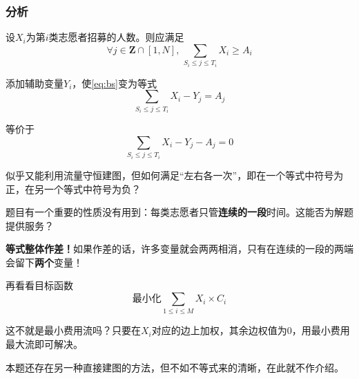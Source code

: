 \subsubsection{分析}
设$X_i$为第$i$类志愿者招募的人数。则应满足
\begin{equation} \label{eq:bs}
\forall j \in \mathbf{Z} \cap [1, N], \, \sum_{S_i \le j \le T_i}{X_i} \ge A_i
\end{equation}
\par 添加辅助变量$Y_i$，使\eqref{eq:bs}变为等式
\begin{displaymath}
\sum_{S_i \le j \le T_i}{X_i} - Y_j = A_j
\end{displaymath}
\par 等价于
\begin{displaymath} 
\sum_{S_i \le j \le T_i}{X_i} - Y_j - A_j = 0
\end{displaymath}
\par 似乎又能利用流量守恒建图，但如何满足“左右各一次”，即在一个等式中符号为正，在另一个等式中符号为负？
\par 题目有一个重要的性质没有用到：每类志愿者只管\textbf{连续的一段}时间。这能否为解题提供服务？
\par \textbf{等式整体作差！}如果作差的话，许多变量就会两两相消，只有在连续的一段的两端会留下\textbf{两个}变量！
\par 再看看目标函数
\begin{displaymath}
\text{最小化}\sum_{1 \le i \le M}{X_i \times C_i}
\end{displaymath}
\par 这不就是最小费用流吗？只要在$X_i$对应的边上加权，其余边权值为0，用最小费用最大流即可解决。
\vspace{8pt} \par 本题还存在另一种直接建图的方法，但不如不等式来的清晰，在此就不作介绍。
